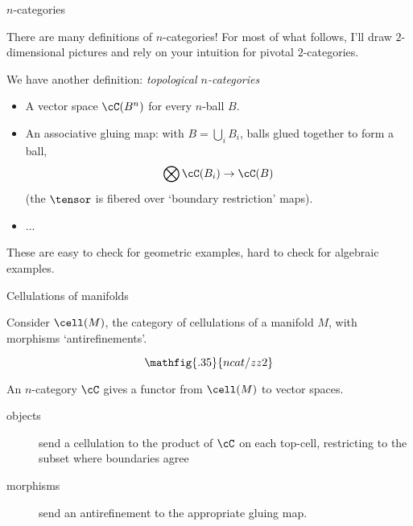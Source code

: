 \documentclass[beamer, compress]{beamer}
\begin{document}
\begin{frame}{$n$-categories}
\begin{block}{There are many definitions of $n$-categories!}
For most of what follows, I'll draw $2$-dimensional pictures and rely on your intuition for pivotal $2$-categories. 
\end{block}
\begin{block}{We have another definition: \emph{topological $n$-categories}}
\begin{itemize}
\item A vector space $\cC(B^n)$ for every $n$-ball $B$.
\item An associative gluing map: with $B = \bigcup_i B_i$, balls glued together to form a ball,
$$\bigotimes \cC(B_i) \to \cC(B)$$
(the $\tensor$ is fibered over `boundary restriction' maps).
\item ...
\end{itemize}
\end{block}
These are easy to check for geometric examples, hard to check for algebraic examples.
\end{frame}

\begin{frame}{Cellulations of manifolds}
\begin{block}{}
Consider $\cell(M)$, the category of cellulations of a manifold $M$, with morphisms `antirefinements'.
\end{block}
\vspace{-4mm}
$$\mathfig{.35}{ncat/zz2}$$
\vspace{-4mm}
\begin{block}{}
An $n$-category $\cC$ gives a functor from $\cell(M)$ to vector spaces.
\begin{description}
\item[objects] send a cellulation to the product of $\cC$ on each top-cell, restricting to the subset where boundaries agree
\item[morphisms] send an antirefinement to the appropriate gluing map.
\end{description}
\end{block}
\end{frame}
\end{document}
